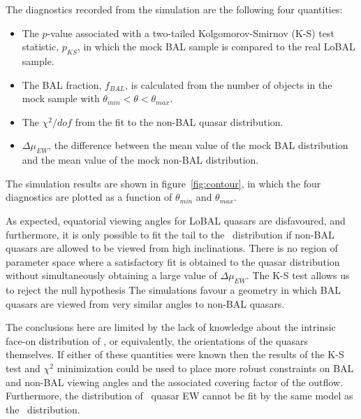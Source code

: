 The diagnostics recorded from the simulation are the following four
quantities:
\begin{itemize}
	\item The $p$-value associated with a two-tailed Kolgomorov-Smirnov (K-S) 
	test statistic, $p_{KS}$, in which the mock BAL sample is compared
	to the real LoBAL sample.
	\item The BAL fraction, $f_{BAL}$, is calculated from the 
	number of objects in the mock sample with $\theta_{min}<\theta<\theta_{max}$.
	\item The $\chi^2/dof$ from the fit to the non-BAL quasar distribution.
	\item $\Delta \mu_{EW}$, the difference between the mean value of the mock BAL
	distribution and the mean value of the mock non-BAL distribution.
\end{itemize}
The simulation results are shown in figure~\ref{fig:contour}, in which the 
four diagnostics are plotted as a function of $\theta_{min}$ 
and $\theta_{max}$. 

As expected, equatorial viewing angles for LoBAL quasars 
are disfavoured, and furthermore, it is only possible to fit
the tail to the \ewo\ distribution if non-BAL quasars are allowed 
to be viewed from high inclinations. There is no region of parameter
space where a satisfactory fit is obtained to the quasar distribution
without simultaneously obtaining a large value of $\Delta \mu_{EW}$. The
K-S test allows us to reject the null hypothesis
The simulations favour a geometry in which BAL quasars are viewed
from very similar angles to non-BAL quasars.

The conclusions here are limited by the lack of knowledge about the 
intrinsic face-on distribution of \ewo, or equivalently,
the orientations of the quasars themselves. If either of these
quantities were known then the results of the
K-S test and $\chi^2$ minimization could be used
to place more robust constraints on BAL and non-BAL viewing angles 
and the associated covering factor of the outflow.
Furthermore, the distribution of \civ\ quasar EW cannot be fit by 
the same model as the \ewo\ distribution.

